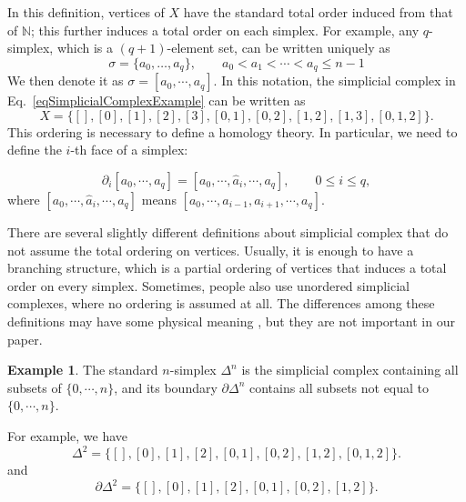 \documentclass[reprint, amsmath, amssymb, showpacs, floatfix, longbibliography, aps, twocolumn, superscriptaddress, nofootinbib]{revtex4-2}
\newcommand{\NN}{{\mathbb N}}
\theoremstyle{definition}
\newtheorem{example}{Example}[section]
\begin{document}
In this definition, vertices of $X$ have the standard total order induced from that of $\NN$; this further induces a total order on each simplex. For example, any $q$-simplex, which is a $(q+1)$-element set, can be written uniquely as
\[
\sigma = \{a_0,\dots,a_q\},\qquad 
 a_0 < a_1 < \cdots < a_q \le n-1
\]
We then denote it as $\sigma=[a_0,\cdots,a_q]$. In this notation, the simplicial complex in Eq.~\eqref{eqSimplicialComplexExample} can be written as
\begin{equation}
	X=\{[],[0],[1],[2],[3],[0,1],[0,2],[1,2],[1,3],[0,1,2]\}.
\end{equation}
This ordering is necessary to define a homology theory. In particular, we need to define the $i$-th face of a simplex:

\begin{equation}\label{eqPartiali}
	\partial_i [a_0,\cdots,a_q]=[a_0,\cdots,\hat{a}_i,\cdots,a_q],\qquad 0\le i\le q,
\end{equation}
where $[a_0,\cdots,\hat{a}_i,\cdots,a_q]$ means $[a_0,\cdots,a_{i-1},a_{i+1},\cdots,a_q]$.


There are several slightly different definitions about simplicial complex that do not assume the total ordering on vertices. Usually, it is enough to have a branching structure, which is a partial ordering of vertices that induces a total order on every simplex. Sometimes, people also use unordered simplicial complexes, where no ordering is assumed at all. The differences among these definitions may have some physical meaning \cite{Wan_2022}, but they are not important in our paper.

\begin{example}
	The standard $n$-simplex $\Delta^n$ is the simplicial complex containing all subsets of $\{0,\cdots,n\}$, and its boundary $\partial\Delta^n$ contains all subsets not equal to $\{0,\cdots,n\}$.
	
	For example, we have
	\begin{equation}
		\Delta^2=\{[],[0],[1],[2],[0,1],[0,2],[1,2],[0,1,2]\}.
	\end{equation}
	and
	\begin{equation}
		\partial\Delta^2=\{[],[0],[1],[2],[0,1],[0,2],[1,2]\}.
	\end{equation}
\end{example}
\end{document}
